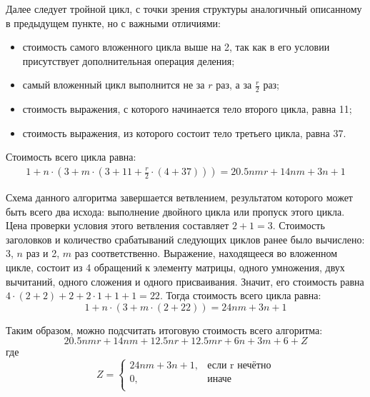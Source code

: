 Далее следует тройной цикл, с точки зрения структуры аналогичный описанному в предыдущем пункте, но с важными отличиями:
\begin{itemize}
    \item стоимость самого вложенного цикла выше на 2, так как в его условии присутствует дополнительная операция деления;
    \item самый вложенный цикл выполнится не за $r$ раз, а за $\frac{r}{2}$ раз;
    \item стоимость выражения, с которого начинается тело второго цикла, равна 11;
    \item стоимость выражения, из которого состоит тело третьего цикла, равна 37.
\end{itemize}
Стоимость всего цикла равна:
\begin{equation}
    \begin{gathered}
        1 + n\cdot{}(3 + m\cdot(3 + 11 + \frac{r}{2}\cdot{}(4 + 37))) = 20.5nmr + 14nm + 3n + 1
    \end{gathered}
\end{equation}

Схема данного алгоритма завершается ветвлением, результатом которого может быть всего два исхода: выполнение двойного цикла или пропуск этого цикла. Цена проверки условия этого ветвления составляет $2 + 1 = 3$. Стоимость заголовков и количество срабатываний следующих циклов ранее было вычислено: 3, $n$ раз и 2, $m$ раз соответственно. Выражение, находящееся во вложенном цикле, состоит из 4 обращений к элементу матрицы, одного умножения, двух вычитаний, одного сложения и одного присваивания. Значит, его стоимость равна $4\cdot{}(2 + 2) + 2 + 2\cdot{}1 + 1 + 1 = 22$. Тогда стоимость всего цикла равна:
\begin{equation}
    1 + n\cdot{}(3 + m\cdot{}(2 + 22)) = 24nm + 3n + 1
\end{equation}

Таким образом, можно подсчитать итоговую стоимость всего алгоритма:
\begin{equation}
    20.5nmr + 14nm + 12.5nr + 12.5mr + 6n + 3m + 6 + Z
\end{equation}
где
\begin{equation}
Z = \left\{ \begin{array}{ll}
 24nm + 3n + 1, & \textrm{если r нечётно}\\
 0, & \textrm{иначе}\\
\end{array} \right.
\end{equation}

